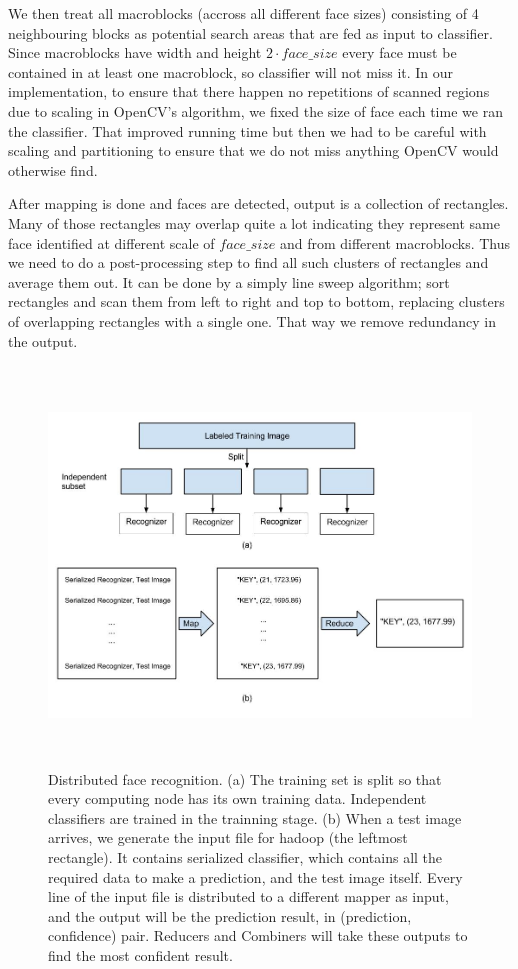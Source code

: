 \documentclass[11pt, draftclsnofoot, onecolumn]{IEEEtran}
\begin{document}
We then treat all macroblocks (accross all different face sizes) consisting of 4 neighbouring blocks as potential search areas that are fed as input to classifier. Since macroblocks have width and height $2 \cdot face\_size$ every face must be contained in at least one macroblock, so classifier will not miss it. In our implementation, to ensure that there happen no repetitions of scanned regions due to scaling in OpenCV's algorithm, we fixed the size of face each time we ran the classifier. That improved running time but then we had to be careful with scaling and partitioning to ensure that we do not miss anything OpenCV would otherwise find.

After mapping is done and faces are detected, output is a collection of rectangles. Many of those rectangles may overlap quite a lot indicating they represent same face identified at different scale of $face\_size$ and from different macroblocks. Thus we need to do a post-processing step to find all such clusters of rectangles and average them out. It can be done by a simply line sweep algorithm; sort rectangles and scan them from left to right and top to bottom, replacing clusters of overlapping rectangles with a single one. That way we remove redundancy in the output. 

\begin{figure}
\centering
\includegraphics[height=300pt]{recog_overview}
\caption{Distributed face recognition. (a) The training set is split so that every computing node has its own training data. Independent classifiers are trained in the trainning stage. (b) When a test image arrives, we generate the input file for hadoop (the leftmost rectangle). It contains serialized classifier, which contains all the required data to make a prediction, and the test image itself. Every line of the input file is distributed to a different mapper as input, and the output will be the prediction result, in (prediction, confidence) pair. Reducers and Combiners will take these outputs to find the most confident result.}
\label{fig:recog_overview}
\end{figure}
\end{document}
